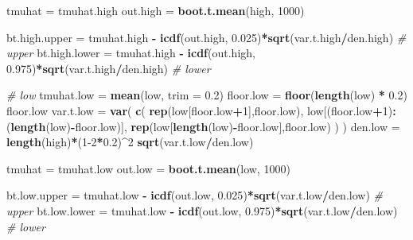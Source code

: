 \documentclass[
]{article}
\newenvironment{Shaded}{\begin{snugshade}}{\end{snugshade}}
\newcommand{\AttributeTok}[1]{\textcolor[rgb]{0.13,0.29,0.53}{#1}}
\newcommand{\CommentTok}[1]{\textcolor[rgb]{0.56,0.35,0.01}{\textit{#1}}}
\newcommand{\DecValTok}[1]{\textcolor[rgb]{0.00,0.00,0.81}{#1}}
\newcommand{\FloatTok}[1]{\textcolor[rgb]{0.00,0.00,0.81}{#1}}
\newcommand{\FunctionTok}[1]{\textcolor[rgb]{0.13,0.29,0.53}{\textbf{#1}}}
\newcommand{\NormalTok}[1]{#1}
\newcommand{\OtherTok}[1]{\textcolor[rgb]{0.56,0.35,0.01}{#1}}
\newcommand{\SpecialCharTok}[1]{\textcolor[rgb]{0.81,0.36,0.00}{\textbf{#1}}}
\begin{document}
\begin{Shaded}
\begin{Highlighting}[]
\NormalTok{tmuhat }\OtherTok{=}\NormalTok{ tmuhat.high}
\NormalTok{out.high }\OtherTok{=} \FunctionTok{boot.t.mean}\NormalTok{(high, }\DecValTok{1000}\NormalTok{)}

\NormalTok{bt.high.upper }\OtherTok{=}\NormalTok{ tmuhat.high }\SpecialCharTok{{-}} \FunctionTok{icdf}\NormalTok{(out.high, }\FloatTok{0.025}\NormalTok{)}\SpecialCharTok{*}\FunctionTok{sqrt}\NormalTok{(var.t.high}\SpecialCharTok{/}\NormalTok{den.high) }\CommentTok{\# upper}
\NormalTok{bt.high.lower }\OtherTok{=}\NormalTok{ tmuhat.high }\SpecialCharTok{{-}} \FunctionTok{icdf}\NormalTok{(out.high, }\FloatTok{0.975}\NormalTok{)}\SpecialCharTok{*}\FunctionTok{sqrt}\NormalTok{(var.t.high}\SpecialCharTok{/}\NormalTok{den.high) }\CommentTok{\# lower}

\CommentTok{\# low}
\NormalTok{tmuhat.low }\OtherTok{=} \FunctionTok{mean}\NormalTok{(low, }\AttributeTok{trim =} \FloatTok{0.2}\NormalTok{)}
\NormalTok{floor.low }\OtherTok{=} \FunctionTok{floor}\NormalTok{(}\FunctionTok{length}\NormalTok{(low) }\SpecialCharTok{*} \FloatTok{0.2}\NormalTok{)}
\NormalTok{floor.low}
\NormalTok{var.t.low }\OtherTok{=} \FunctionTok{var}\NormalTok{(}
    \FunctionTok{c}\NormalTok{(}
        \FunctionTok{rep}\NormalTok{(low[floor.low}\SpecialCharTok{+}\DecValTok{1}\NormalTok{],floor.low),}
\NormalTok{        low[(floor.low}\SpecialCharTok{+}\DecValTok{1}\NormalTok{)}\SpecialCharTok{:}\NormalTok{(}\FunctionTok{length}\NormalTok{(low)}\SpecialCharTok{{-}}\NormalTok{floor.low)],}
        \FunctionTok{rep}\NormalTok{(low[}\FunctionTok{length}\NormalTok{(low)}\SpecialCharTok{{-}}\NormalTok{floor.low],floor.low)}
\NormalTok{    )}
\NormalTok{)}
\NormalTok{den.low }\OtherTok{=} \FunctionTok{length}\NormalTok{(high)}\SpecialCharTok{*}\NormalTok{(}\DecValTok{1{-}2}\SpecialCharTok{*}\FloatTok{0.2}\NormalTok{)}\SpecialCharTok{\^{}}\DecValTok{2}
\FunctionTok{sqrt}\NormalTok{(var.t.low}\SpecialCharTok{/}\NormalTok{den.low)}

\NormalTok{tmuhat }\OtherTok{=}\NormalTok{ tmuhat.low}
\NormalTok{out.low }\OtherTok{=} \FunctionTok{boot.t.mean}\NormalTok{(low, }\DecValTok{1000}\NormalTok{)}

\NormalTok{bt.low.upper }\OtherTok{=}\NormalTok{ tmuhat.low }\SpecialCharTok{{-}} \FunctionTok{icdf}\NormalTok{(out.low, }\FloatTok{0.025}\NormalTok{)}\SpecialCharTok{*}\FunctionTok{sqrt}\NormalTok{(var.t.low}\SpecialCharTok{/}\NormalTok{den.low) }\CommentTok{\# upper}
\NormalTok{bt.low.lower }\OtherTok{=}\NormalTok{ tmuhat.low }\SpecialCharTok{{-}} \FunctionTok{icdf}\NormalTok{(out.low, }\FloatTok{0.975}\NormalTok{)}\SpecialCharTok{*}\FunctionTok{sqrt}\NormalTok{(var.t.low}\SpecialCharTok{/}\NormalTok{den.low) }\CommentTok{\# lower}



\end{Highlighting}
\end{Shaded}
\end{document}
